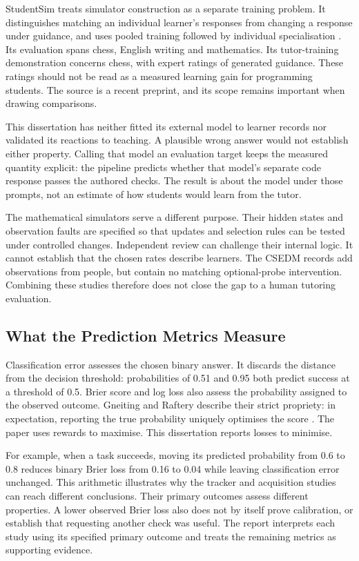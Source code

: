 StudentSim treats simulator construction as a separate training problem. It distinguishes matching an individual learner's
responses from changing a response under guidance, and uses pooled training followed by individual specialisation
\parencite[Sections 3--4]{yang2026studentsim}. Its evaluation spans chess, English writing and mathematics. Its tutor-training
demonstration concerns chess, with expert ratings of generated guidance. These ratings should not be read as a measured
learning gain for programming students. The source is a recent preprint, and its scope remains important when drawing comparisons.

This dissertation has neither fitted its external model to learner records nor validated its reactions to teaching. A plausible
wrong answer would not establish either property. Calling that model an evaluation target keeps the measured quantity explicit:
the pipeline predicts whether that model's separate code response passes the authored checks. The result is about the model
under those prompts, not an estimate of how students would learn from the tutor.

The mathematical simulators serve a different purpose. Their hidden states and observation faults are specified so that
updates and selection rules can be tested under controlled changes. Independent review can challenge their internal logic.
It cannot establish that the chosen rates describe learners. The CSEDM records add observations from people, but contain no
matching optional-probe intervention. Combining these studies therefore does not close the gap to a human tutoring evaluation.

\subsection{What the Prediction Metrics Measure}

Classification error assesses the chosen binary answer. It discards the distance from the decision threshold: probabilities
of 0.51 and 0.95 both predict success at a threshold of 0.5. Brier score and log loss also assess the probability assigned to
the observed outcome. Gneiting and Raftery describe their strict propriety: in expectation, reporting the true probability
uniquely optimises the score \parencite[Section 3, Examples 1--2]{gneiting2007strictly}. The paper uses rewards to maximise.
This dissertation reports losses to minimise.

For example, when a task succeeds, moving its predicted probability from 0.6 to 0.8 reduces binary Brier loss from 0.16 to
0.04 while leaving classification error unchanged. This arithmetic illustrates why the tracker and acquisition studies can
reach different conclusions. Their primary outcomes assess different properties. A lower observed Brier loss also does not
by itself prove calibration, or establish that requesting another check was useful. The report interprets each study using
its specified primary outcome and treats the remaining metrics as supporting evidence.

